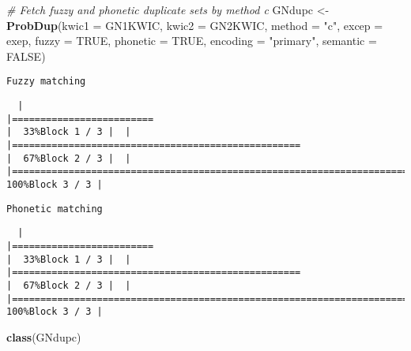 \documentclass[
]{article}
\newenvironment{Shaded}{\begin{snugshade}}{\end{snugshade}}
\newcommand{\CommentTok}[1]{\textcolor[rgb]{0.56,0.35,0.01}{\textit{#1}}}
\newcommand{\DataTypeTok}[1]{\textcolor[rgb]{0.13,0.29,0.53}{#1}}
\newcommand{\KeywordTok}[1]{\textcolor[rgb]{0.13,0.29,0.53}{\textbf{#1}}}
\newcommand{\NormalTok}[1]{#1}
\newcommand{\OtherTok}[1]{\textcolor[rgb]{0.56,0.35,0.01}{#1}}
\newcommand{\StringTok}[1]{\textcolor[rgb]{0.31,0.60,0.02}{#1}}
\begin{document}
\begin{Shaded}
\begin{Highlighting}[]
\CommentTok{# Fetch fuzzy and phonetic duplicate sets by method c}
\NormalTok{GNdupc <-}\StringTok{ }\KeywordTok{ProbDup}\NormalTok{(}\DataTypeTok{kwic1 =}\NormalTok{ GN1KWIC, }\DataTypeTok{kwic2 =}\NormalTok{ GN2KWIC, }\DataTypeTok{method =} \StringTok{"c"}\NormalTok{,}
                  \DataTypeTok{excep =}\NormalTok{ exep, }\DataTypeTok{fuzzy =} \OtherTok{TRUE}\NormalTok{, }\DataTypeTok{phonetic =} \OtherTok{TRUE}\NormalTok{,}
                  \DataTypeTok{encoding =} \StringTok{"primary"}\NormalTok{, }\DataTypeTok{semantic =} \OtherTok{FALSE}\NormalTok{)}
\end{Highlighting}
\end{Shaded}

\begin{verbatim}
Fuzzy matching
\end{verbatim}

\begin{verbatim}
  |                                                                                    |=========================                                                   |  33%Block 1 / 3 |  |                                                                                    |===================================================                         |  67%Block 2 / 3 |  |                                                                                    |============================================================================| 100%Block 3 / 3 |
\end{verbatim}

\begin{verbatim}
Phonetic matching
\end{verbatim}

\begin{verbatim}
  |                                                                                    |=========================                                                   |  33%Block 1 / 3 |  |                                                                                    |===================================================                         |  67%Block 2 / 3 |  |                                                                                    |============================================================================| 100%Block 3 / 3 |
\end{verbatim}

\begin{Shaded}
\begin{Highlighting}[]
\KeywordTok{class}\NormalTok{(GNdupc)}
\end{Highlighting}
\end{Shaded}
\end{document}
